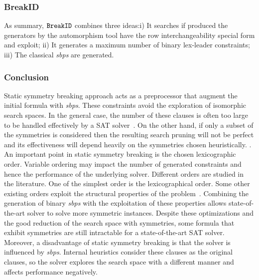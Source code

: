 \subsubsection{BreakID}
As summary, $\texttt{BreakID}$ combines three ideas:i) It searches if produced the generators by the automorphism tool 
have the row interchangeability special form and exploit;
ii) It generates a maximum number of binary lex-leader constraints; iii) The classical \textit{sbps} are 
generated.

%

\subsubsection{Conclusion}
Static symmetry breaking approach acts as a preprocessor that augment the initial formula with
\textit{sbps}. These constraints avoid the exploration of isomorphic search spaces.
In the general case, the number of these clauses is often too large to be
 handled  effectively by a SAT solver~\cite{Luks2004}. 
On the other hand, if only a subset of the symmetries is considered then the resulting search pruning
will not be perfect and its effectiveness will depend heavily on the symmetries chosen heuristically. 
 \cite{biere2009handbook}.
An important point in static symmetry breaking is the chosen lexicographic order.
Variable ordering may impact the number of generated constraints and hence the performance of
the underlying solver. Different orders are studied in the literature. 
One of the simplest order is the  lexicographical order.
Some other existing orders exploit the structural properties of the 
problem~\cite{devriendt2016improved}. Combining the generation of binary \textit{sbps} with the exploitation of
these properties allows state-of-the-art solver to solve more symmetric instances.
Despite these optimizations and the good reduction of the search space with symmetries,
some formula that exhibit symmetries are still intractable for a state-of-the-art SAT solver.
Moreover, a disadvantage of static symmetry breaking is that the solver is influenced by \textit{sbps}.
Internal heuristics consider these clauses as the original clauses, so the solver explores
the search space with a different manner and affects performance negatively.

